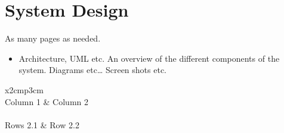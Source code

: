 \chapter{System Design}
As many pages as needed.
\begin{itemize}
\item Architecture, UML etc. An overview of the different components of the system. Diagrams etc… Screen shots etc.
\end{itemize}

\begin{table}[h]
  \centering
  \begin{tabular}{x{2cm}p{3cm}}
    \toprule \\
    Column 1 & Column 2 \\
    \midrule \\
    Rows 2.1 & Row 2.2 \\
    \bottomrule
  \end{tabular}
  \caption{A table.}
  \label{table:mytable}
\end{table}

